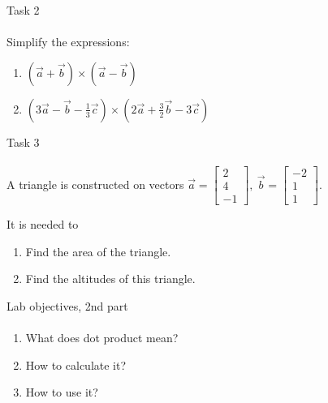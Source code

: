 \documentclass[aspectratio=169,notes]{beamer}
\begin{document}
\begin{frame}[t]{Task 2}
    \framesubtitle{}
    Simplify the expressions:
    \begin{enumerate}
        \item $(\vec{a}+\vec{b})\times(\vec{a}-\vec{b})$
        \item  $(3\vec{a} - \vec{b} - \frac{1}{3}\vec{c}) \times (2\vec{a} + \frac{3}{2}\vec{b} - 3\vec{c})$
    \end{enumerate}
\end{frame}

\begin{frame}[t]{Task 3}
\framesubtitle{}
A triangle is constructed on vectors $\vec{a} = \begin{bmatrix}2\\4\\-1\end{bmatrix},\ \vec{b} = \begin{bmatrix}-2\\1\\1\end{bmatrix}$.

It is needed to
\begin{enumerate}
    \item Find the area of the triangle.
    \item Find the altitudes of this triangle.
\end{enumerate}
\end{frame}

\begin{frame}[t]{Lab objectives, 2nd part}
\framesubtitle{}
    \begin{enumerate}
        \item What does dot product mean?
        \item How to calculate it?
        \item How to use it?
    \end{enumerate}
\end{frame}
\end{document}
